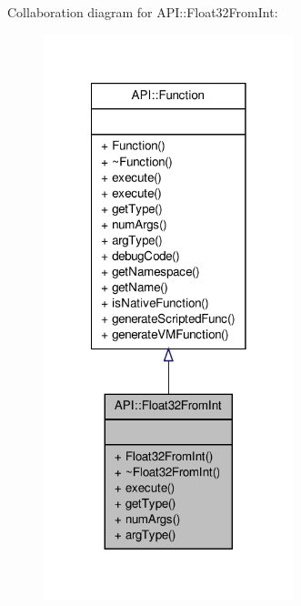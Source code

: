 Collaboration diagram for A\-P\-I\-:\-:Float32\-From\-Int\-:
\nopagebreak
\begin{figure}[H]
\begin{center}
\leavevmode
\includegraphics[width=206pt]{class_a_p_i_1_1_float32_from_int__coll__graph}
\end{center}
\end{figure}
